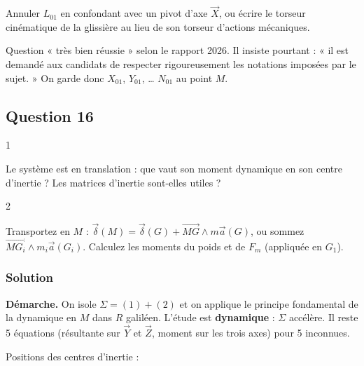 \documentclass[11pt,a4paper]{article}
\begin{document}
\begin{piege}

Annuler \(L_{01}\) en confondant avec un pivot d'axe \(\vec X\), ou écrire le torseur cinématique de la glissière au lieu de son torseur d'actions mécaniques.

\end{piege}

\begin{jury}

Question « très bien réussie » selon le rapport 2026. Il insiste pourtant : « il est demandé aux candidats de respecter rigoureusement les notations imposées par le sujet. » On garde donc \(X_{01}\), \(Y_{01}\), \ldots{} \(N_{01}\) au point \(M\).

\end{jury}

\hypertarget{question-16}{%
\subsection{Question 16}\label{question-16}}

\begin{indication}{1}

Le système est en translation : que vaut son moment dynamique en son centre d'inertie ? Les matrices d'inertie sont-elles utiles ?

\end{indication}

\begin{indication}{2}

Transportez en \(M\) : \(\vec\delta(M) = \vec\delta(G) + \overrightarrow{MG}\wedge m\vec a(G)\), ou sommez \(\overrightarrow{MG_i}\wedge m_i\vec a(G_i)\). Calculez les moments du poids et de \(F_m\) (appliquée en \(G_1\)).

\end{indication}

\hypertarget{solution-15}{%
\subsubsection{Solution}\label{solution-15}}

\textbf{Démarche.} On isole \(\Sigma = (1)+(2)\) et on applique le principe fondamental de la dynamique en \(M\) dans \(R\) galiléen. L'étude est \textbf{dynamique} : \(\Sigma\) accélère. Il reste 5 équations (résultante sur \(\vec Y\) et \(\vec Z\), moment sur les trois axes) pour 5 inconnues.

Positions des centres d'inertie :
\end{document}
